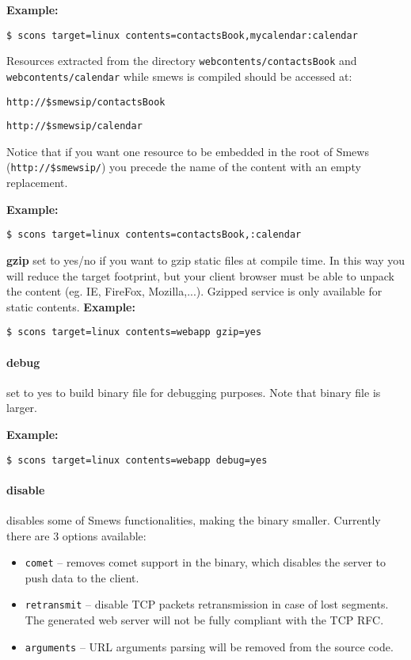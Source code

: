\documentclass{report}
\begin{document}
\textbf{Example:} 
\begin{verbatim}
$ scons target=linux contents=contactsBook,mycalendar:calendar
\end{verbatim}

Resources extracted from the directory \texttt{webcontents/contactsBook} and \texttt{webcontents/calendar} while smews is compiled should be accessed at:

\texttt{http://\$smewsip/contactsBook}

\texttt{http://\$smewsip/calendar}

Notice that if you want one resource to be embedded in the root of Smews (\texttt{http://\$smewsip/}) you precede the name of
the content with an empty replacement.

\textbf{Example:} 
\begin{verbatim}
$ scons target=linux contents=contactsBook,:calendar
\end{verbatim}

\textbf{gzip} set to yes/no if you want to gzip static files at compile time. In this way you will reduce the target footprint, but your client browser must be able to unpack the content (eg. IE, FireFox, Mozilla,...). Gzipped service is only available for static contents.
\textbf{Example:} 
\begin{verbatim}
$ scons target=linux contents=webapp gzip=yes
\end{verbatim}

\paragraph{debug} set to yes to build binary file for debugging purposes. Note that binary file is larger.

\textbf{Example:} 
\begin{verbatim}
$ scons target=linux contents=webapp debug=yes
\end{verbatim}

\paragraph{disable} disables some of Smews functionalities, making the binary smaller.
Currently there are 3 options available:
\begin{itemize}
\item \texttt{comet} -- removes comet support in the binary, which disables the server to push data to the client.
\item \texttt{retransmit} -- disable TCP packets retransmission in case of lost segments. The generated web server will not be fully compliant with the TCP RFC.
\item \texttt{arguments} -- URL arguments parsing will be removed from the source code.
\end{itemize}
\end{document}
